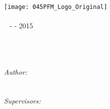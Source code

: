 
\begin{titlepage}

\begin{center}


\texttt{[image: 045PFM\_Logo\_Original]}\\[1cm]    

\textsc{\LARGE \myDepartment}\\[1.5cm]


\textsc{\Large \myTitle ~ -   - 2015}\\[0.5cm]


\HRule \\[0.4cm]
{ \huge \bfseries \myPhd}\\[0.4cm]

\HRule \\[1.5cm]


\begin{minipage}{0.8\textwidth}
\begin{center} \large

\emph{Author:}\\[0.4cm]

\myName \\
\texttt{\myemail}\\[1.5cm]

\emph{Supervisors:} \\[0.4cm]

\myProf \\[0.2cm]
\myOtherProf \\ [0.2cm]

\end{center}

\end{minipage}

\vfill

{\large \myTime}

\end{center}

\end{titlepage}
